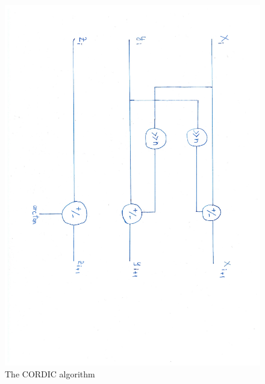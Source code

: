 \documentclass[12pt, a4paper,oneside]{article}
\begin{document}
\begin{figure}[H]
	\centering
	\includegraphics[width = \linewidth,angle=90]{cordic_dfg.pdf}
	\caption{The CORDIC algorithm}
	\label{fig:cordic_algorithm}
\end{figure}

\printbibliography
\end{document}
